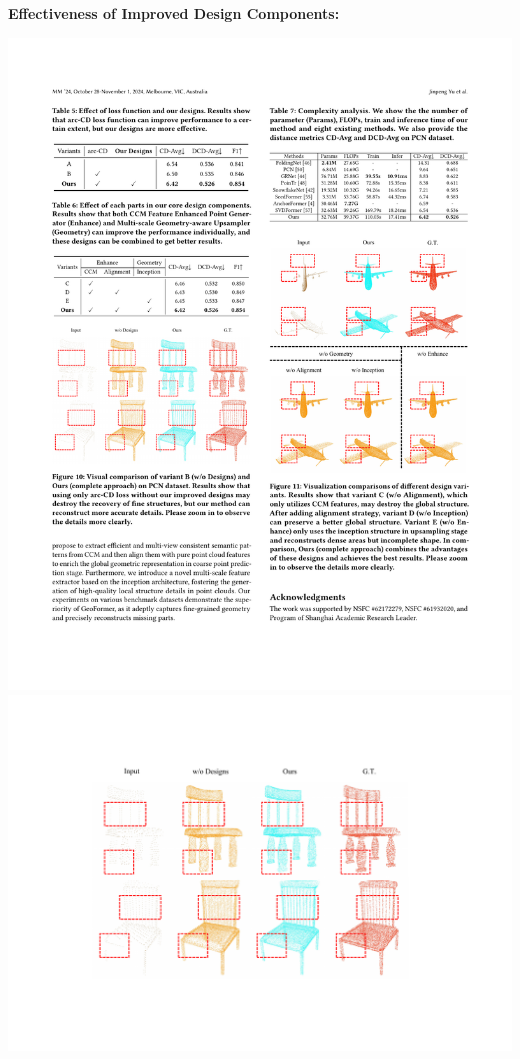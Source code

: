 \documentclass[landscape,a0paper,fontscale=0.292]{baposter}
\begin{document}
\begin{poster}
{\begin{minipage}[t]{0.49\textwidth}
        \textbf{\color{ctitle}Effectiveness of Improved Design Components:} \\
        \begin{minipage}[t]{0.48\textwidth}
            \text{}
            \vspace{-1.5em}
            \begin{center}
                \includegraphics[width=\textwidth]{images/table-ablation-loss.pdf} \\
                \includegraphics[width=\textwidth]{images/result-ablation-loss.pdf} \\

\end{center}
\end{minipage}
\end{minipage}}
\end{poster}
\end{document}
